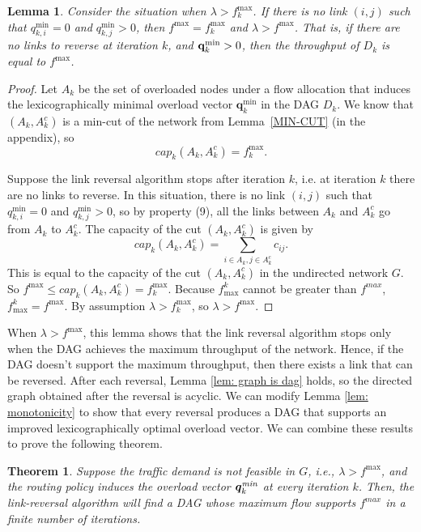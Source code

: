 \documentclass{sig-alternate-2013}
\newtheorem{lemma}{Lemma}
\newtheorem{theorem}{Theorem}
\begin{document}
\begin{lemma}
Consider the situation when $\lambda > f_k^{\max}$. If there  is no link $(i,j)$ such that $q_{k,i}^{\min}=0$ and $q_{k,j}^{\min}>0$, then $f^{\max} = f_k^{\max}$ and $\lambda > f^{\max}$. That is, if there are no links to reverse at iteration $k$, and ${\bf q}_k^{\min} > 0$, then the throughput of $D_k$ is equal to $f^{\max}$.
\end{lemma}
\begin{proof}
Let $A_k$ be the set of overloaded nodes under a flow allocation that induces the lexicographically minimal overload vector $\textbf{q}_k^{\min}$ in the DAG $D_k$. We know that $(A_k,A_k^c)$ is a min-cut of the network from Lemma~\ref{MIN-CUT} (in the appendix), so $$cap_k(A_k,A_k^c) =  f_k^{\max}.$$

Suppose the link reversal algorithm stops after iteration $k$, i.e. at iteration $k$ there are no links to reverse. In this situation, there  is no link $(i,j)$ such that $q_{k,i}^{\min}=0$ and $q_{k,j}^{\min}>0$, so by property (9), all the links between $A_k$ and $A_k^c$ go from $A_k$ to $A_k^c$. The capacity of the cut $(A_k,A_k^c)$ is given by 
$$cap_k(A_k,A_k^c) = \sum_{i\in A_k, j \in A_k^c} c_{ij}.$$
This is equal to the capacity of the cut $(A_k, A_k^c)$ in the undirected network $G$. So $f^{\max} \le cap_k(A_k,A_k^c) = f_k^{\max}$. Because $f^k_{\max}$ cannot be greater than $f^{max}$, $f^k_{\max}=f^{\max}$. By assumption $\lambda > f_k^{\max}$, so $\lambda > f^{\max}$.
\end{proof}

When $\lambda>f^{\max}$, this lemma shows that the link reversal algorithm stops only when the DAG achieves the maximum throughput of the network.  Hence, if the DAG doesn't support the maximum throughput, then there exists a link that can be reversed. After each reversal, Lemma \ref{lem: graph is dag} holds, so the directed graph obtained after the reversal is acyclic. We can modify Lemma \ref{lem: monotonicity} to show that every reversal produces a DAG that supports  an improved lexicographically optimal overload vector. We can combine these results to prove the following theorem.
\begin{theorem}
Suppose the traffic demand is not feasible in $G$, i.e., $\lambda > f^{\max}$, and the routing policy induces the overload vector $\bm q^{\text{\emph{min}}}_k$ at every iteration $k$. Then, the link-reversal algorithm will find a DAG whose maximum flow supports $f^{max}$ in a finite number of iterations.
\end{theorem}
\end{document}
